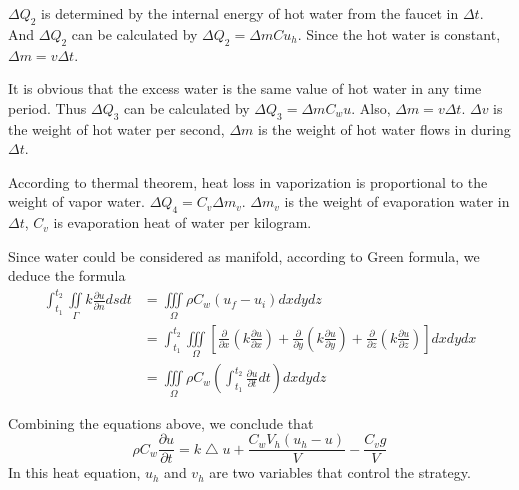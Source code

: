 \documentclass[12pt,a4paper,titlepage]{article}
\begin{document}
$\Delta Q_2$ is determined by the internal energy of hot water from the faucet in $\Delta t$.
And $\Delta Q_2$ can be calculated by
$\Delta Q_2={\Delta m}C{u_h}$.
Since the hot water is constant,
$\Delta m=v{\Delta t}$.

It is obvious that the excess water is the same value of hot water in any time period.
Thus $\Delta Q_3$ can be calculated by
$\Delta Q_3={\Delta m}{C_w}u$.
Also, $\Delta m=v{\Delta t}$.
$\Delta v$ is the weight of hot water per second, $\Delta m$ is the weight of hot water flows in during $\Delta t$.

According to thermal theorem, heat loss in vaporization is proportional to the weight of vapor water.
$\Delta Q_4={C_v}\Delta {m_v}$.
$\Delta {m_v}$ is the weight of evaporation water in $\Delta t$, ${C_v}$ is evaporation heat of water per kilogram.

Since water could be considered as manifold, according to Green formula, we deduce the formula
\begin{displaymath}
\begin{aligned}
\int_{t_1}^{t_2} \iint\limits_{\Gamma}k\frac{\partial u}{\partial n}dsdt & =\iiint\limits_{\Omega}\rho C_{w}(u_f - u_i)dx dy dz\\
& =\int_{t_1}^{t_2}\iiint\limits_{\Omega}[\frac{\partial}{\partial x}(k\frac{\partial u}{\partial x})+\frac{\partial}{\partial y}(k\frac{\partial u}{\partial y})+\frac{\partial}{\partial z}(k\frac{\partial u}{\partial z})]dxdydx\\
& = \iiint\limits_{\Omega}\rho C_{w}(\int_{t_1}^{t_2}\frac{\partial u}{\partial t}dt)dxdydz
\end{aligned}
\end{displaymath}

Combining the equations above, we conclude that
\begin{equation}
\rho C_{w}\frac{\partial u}{\partial t}=k\bigtriangleup u+\frac{C_w V_h(u_h-u)}{V}-\frac{C_v g}{V}%
\end{equation}
In this heat equation, $u_h$ and $v_h$ are two variables that control the strategy.
\end{document}
